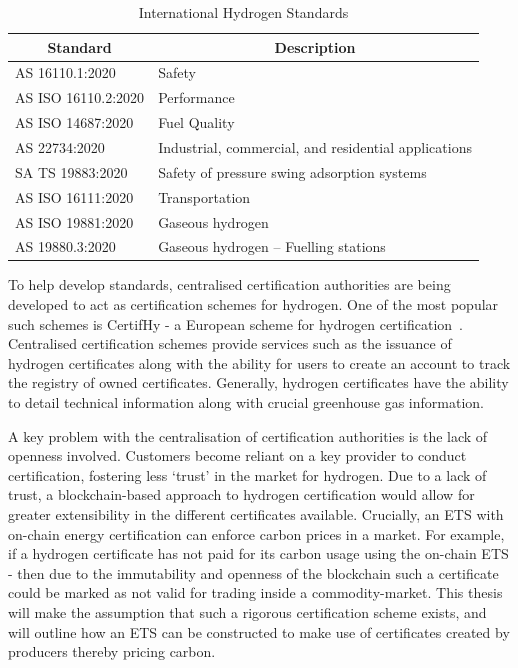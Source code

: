 \begin{table}[H]
    \centering
    \begin{tabular}{|l|l|}
        \hline
        \multicolumn{1}{|c|}{\textbf{Standard}} & \multicolumn{1}{c|}{\textbf{Description}}            \\ \hline
        AS 16110.1:2020                         & Safety                                               \\ \hline
        AS ISO 16110.2:2020                     & Performance                                          \\ \hline
        AS ISO 14687:2020                       & Fuel Quality                                         \\ \hline
        AS 22734:2020                           & Industrial, commercial, and residential applications \\ \hline
        SA TS 19883:2020                        & Safety of pressure swing adsorption systems          \\ \hline
        AS ISO 16111:2020                       & Transportation                                       \\ \hline
        AS ISO 19881:2020                       & Gaseous hydrogen                                     \\ \hline
        AS 19880.3:2020                         & Gaseous hydrogen – Fuelling stations                 \\ \hline
    \end{tabular}
    \caption{International Hydrogen Standards}
    \label{tab:standards}
\end{table}
To help develop standards, centralised certification authorities
are being developed to act as certification schemes for hydrogen.
One of the most popular such schemes is CertifHy - a European
scheme for hydrogen certification~\cite{certifhy}. Centralised
certification schemes provide services such as the issuance of
hydrogen certificates along with the ability for users to create
an account to track the registry of owned certificates. Generally,
hydrogen certificates have the ability to detail technical information
along with crucial greenhouse gas information.

A key problem with the centralisation of certification authorities is the
lack of openness involved. Customers become reliant on a key provider to
conduct certification, fostering less `trust' in the market for hydrogen.
Due to a lack of trust, a blockchain-based approach to hydrogen
certification would allow for greater extensibility in the different
certificates available. Crucially, an ETS with on-chain energy
certification can enforce carbon prices in a market. For example,
if a hydrogen certificate has not paid for its carbon usage using
the on-chain ETS - then due to the immutability and openness of the
blockchain such a certificate could be marked as not valid for
trading inside a commodity-market. This thesis will make the
assumption that such a rigorous certification scheme exists, and will
outline how an ETS can be constructed to
make use of certificates created by producers thereby pricing carbon.

